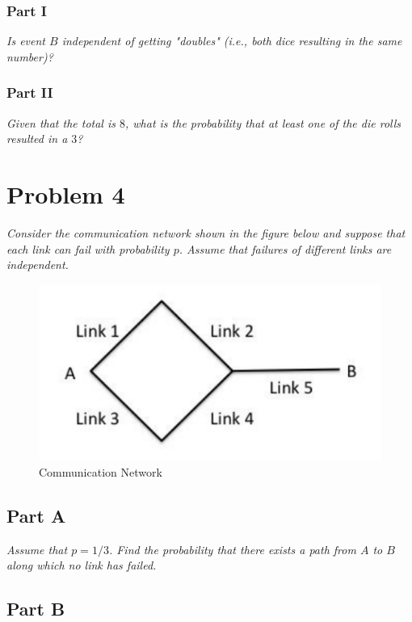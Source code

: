 \documentclass{article}
\begin{document}
\subsubsection*{Part I}

\textit{Is event $ B $ independent of getting "doubles" (i.e., both dice
resulting in the same number)?}

\subsubsection*{Part II}

\textit{Given that the total is $ 8 $, what is the probability that at least one
of the die rolls resulted in a $ 3 $?}

\section*{Problem 4}

\textit{Consider the communication network shown in the figure below and suppose
that each link can fail with probability $ p $. Assume that failures of
different links are independent.}

\begin{figure}[H]
    \centering
    \includegraphics[scale=1]{"P4"}
    \caption{ Communication Network }
\end{figure}

\subsection*{Part A}

\textit{Assume that $ p = 1/3 $. Find the probability that there exists a path
from $ A $ to $ B $ along which no link has failed.}

\subsection*{Part B}
\end{document}
